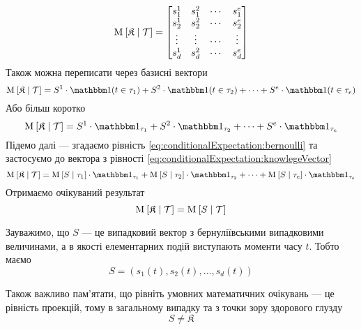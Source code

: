 \begin{equation*}
  \operatorname{M}_{} \left[ \mathfrak{K} \;\middle|\; \mathcal{T} \right] =
  \begin{bmatrix}
    s_1^1 & s_1^2 & \cdots & s_1^e \\
    s_2^1 & s_2^2 & \cdots & s_2^e \\
    \vdots & \vdots & \cdots & \vdots \\
    s_d^1 & s_d^2 & \cdots & s_d^e \\
  \end{bmatrix}
\end{equation*}
Також можна переписати через базисні вектори
\begin{equation*}
  \Mean{\mathfrak{K} \mcond \mathcal{T}} =
  S^1 \cdot \indicator{t \in \tau_1} + S^2 \cdot \indicator{t \in \tau_2}
    + \cdots + S^e \cdot \indicator{t \in \tau_e}
\end{equation*}
Або більш коротко
\begin{equation}\label{eq:conditionalExpectation:knowlegeVector}
  \Mean{\mathfrak{K} \mcond \mathcal{T}} =
  S^1 \cdot \indicatorof{\tau_1} + S^2 \cdot \indicatorof{\tau_2}
    + \cdots + S^e \cdot \indicatorof{\tau_e}
\end{equation}
Підемо далі --- згадаємо рівність \eqref{eq:conditionalExpectation:bernoulli} та
застосуємо до вектора з рівності \eqref{eq:conditionalExpectation:knowlegeVector}
\begin{equation*}
  \Mean{\mathfrak{K} \mcond \mathcal{T}} =
  \Mean{S \mcond \tau_1} \cdot \indicatorof{\tau_1}
    + \Mean{S \mcond \tau_2} \cdot \indicatorof{\tau_2}
    + \cdots
    + \Mean{S \mcond \tau_e} \cdot \indicatorof{\tau_e}
\end{equation*}
Отримаємо очікуваний результат
\begin{equation*}
  \operatorname{M}_{} \left[ \mathfrak{K} \;\middle|\; \mathcal{T} \right] = \operatorname{M}_{} \left[ S \;\middle|\; \mathcal{T} \right]
\end{equation*}

Зауважимо, що $S$ --- це випадковий вектор з бернуліївськими випадковими
величинами, а в якості елементарних подій виступають моменти часу $t$.
Тобто маємо
\begin{equation*}
  S = \left( s_1\left( t \right), s_2\left( t \right),
    \dots, s_d\left( t \right) \right)
\end{equation*}

Також важливо пам’ятати, що рівніть умовних математичних очікувань --- це
рівність проекцій, тому в загальному випадку та з точки зору здорового глузду
\begin{equation*}
  S \neq \mathfrak{K}
\end{equation*}

